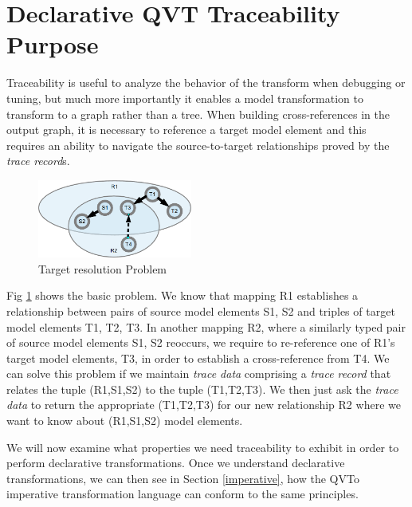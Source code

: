 \documentclass[runningheads,a4paper]{llncs}
\begin{document}

\section{Declarative QVT Traceability Purpose}\label{axioms}

Traceability is useful to analyze the behavior of the transform when debugging or tuning, but much more importantly it enables a model transformation to transform to a graph rather than a tree. When building cross-references in the output graph, it is necessary to reference a target model element and this requires an ability to navigate the source-to-target relationships proved by the \emph{trace record}s.

\begin{figure}
  \begin{center}
    \includegraphics[width=2.0in]{Problem.png}
  \end{center}
  \caption{Target resolution Problem}
  \label{fig:Problem}
\end{figure}

Fig \ref{fig:Problem} shows the basic problem. We know that mapping R1 establishes a relationship between pairs of source model elements S1, S2 and triples of target model elements T1, T2, T3. In another mapping R2, where a similarly typed pair of source model elements S1, S2 reoccurs, we require to re-reference one of R1's target model elements, T3, in order to establish a cross-reference from T4. We can solve this problem if we maintain \emph{trace data} comprising a \emph{trace record} that relates the tuple (R1,S1,S2) to the tuple (T1,T2,T3). We then just ask the \emph{trace data} to return the appropriate (T1,T2,T3) for our new relationship R2 where we want to know about (R1,S1,S2) model elements.

We will now examine what properties we need traceability to exhibit in order to perform declarative transformations. Once we understand declarative transformations, we can then see in Section \ref{imperative}, how the QVTo imperative transformation language can conform to the same principles.
\end{document}
